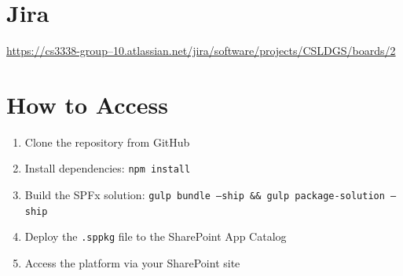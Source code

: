 \documentclass[12pt]{article}
\begin{document}
\section{Jira}
\href{https://cs3338-group--10.atlassian.net/jira/software/projects/CSLDGS/boards/2}{https://cs3338-group--10.atlassian.net/jira/software/projects/CSLDGS/boards/2}

\section{How to Access}
\begin{enumerate}
    \item Clone the repository from GitHub
    \item Install dependencies: \texttt{npm install}
    \item Build the SPFx solution: \texttt{gulp bundle --ship \&\& gulp package-solution --ship}
    \item Deploy the \texttt{.sppkg} file to the SharePoint App Catalog
    \item Access the platform via your SharePoint site
\end{enumerate}
\end{document}
